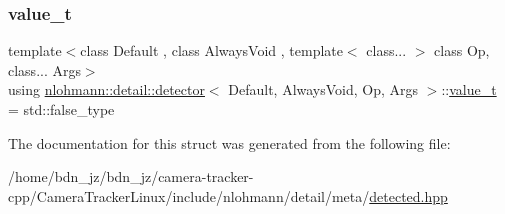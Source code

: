 \mbox{\label{structnlohmann_1_1detail_1_1detector_a5a132aab543d1706e2439268faf8d487}} 
\subsubsection{\texorpdfstring{value\+\_\+t}{value\_t}}
{\footnotesize\ttfamily template$<$class Default , class Always\+Void , template$<$ class... $>$ class Op, class... Args$>$ \\
using \hyperlink{structnlohmann_1_1detail_1_1detector}{nlohmann\+::detail\+::detector}$<$ Default, Always\+Void, Op, Args $>$\+::\hyperlink{structnlohmann_1_1detail_1_1detector_a5a132aab543d1706e2439268faf8d487}{value\+\_\+t} =  std\+::false\+\_\+type}



The documentation for this struct was generated from the following file\+:\begin{DoxyCompactItemize}
\item 
/home/bdn\+\_\+jz/bdn\+\_\+jz/camera-\/tracker-\/cpp/\+Camera\+Tracker\+Linux/include/nlohmann/detail/meta/\hyperlink{detected_8hpp}{detected.\+hpp}\end{DoxyCompactItemize}
